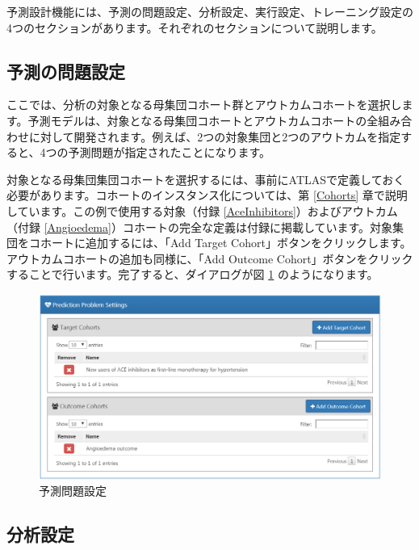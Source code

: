 \documentclass[
  11pt]{book}
\theoremstyle{definition}
\theoremstyle{definition}
\theoremstyle{definition}
\theoremstyle{definition}
\theoremstyle{remark}
\begin{document}
予測設計機能には、予測の問題設定、分析設定、実行設定、トレーニング設定の4つのセクションがあります。それぞれのセクションについて説明します。

\subsection{予測の問題設定}\label{ux4e88ux6e2cux306eux554fux984cux8a2dux5b9a}

ここでは、分析の対象となる母集団コホート群とアウトカムコホートを選択します。予測モデルは、対象となる母集団コホートとアウトカムコホートの全組み合わせに対して開発されます。例えば、2つの対象集団と2つのアウトカムを指定すると、4つの予測問題が指定されたことになります。

対象となる母集団集団コホートを選択するには、事前にATLASで定義しておく必要があります。コホートのインスタンス化については、第 \ref{Cohorts} 章で説明しています。この例で使用する対象（付録 \ref{AceInhibitors}）およびアウトカム（付録 \ref{Angioedema}）コホートの完全な定義は付録に掲載しています。対象集団をコホートに追加するには、「Add Target Cohort」ボタンをクリックします。アウトカムコホートの追加も同様に、「Add Outcome Cohort」ボタンをクリックすることで行います。完了すると、ダイアログが図 \ref{fig:problemSettings} のようになります。

\begin{figure}

{\centering \includegraphics[width=1\linewidth]{images/PatientLevelPrediction/problemSettings} 

}

\caption{予測問題設定}\label{fig:problemSettings}
\end{figure}

\subsection{分析設定}\label{ux5206ux6790ux8a2dux5b9a}
\end{document}
